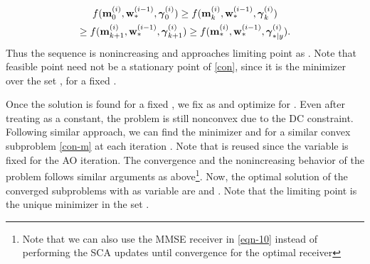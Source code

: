 \begin{multline} \label{con-convergence}
f(\iter{\mx}{0}{i},\iter{\my}{\ast}{i-1},\iter{\mz}{0}{i}) \geq f(\iter{\mx}{k}{i},\iter{\my}{\ast}{i-1},\iter{\mz}{k}{i}) \\ \geq f(\iter{\mx}{k+1}{i},\iter{\my}{\ast}{i-1},\iter{\mz}{k+1}{i}) \geq f(\iter{\mx}{\ast}{i},\iter{\my}{\ast}{i-1},\iter{\mz}{\ast|y}{i}). 
\end{multline}
Thus the sequence  is nonincreasing and approaches limiting point as . Note that feasible point  need not be a stationary point of \eqref{con}, since it is the minimizer over the set , for a fixed \me{\my}.

Once the solution is found for a fixed \me{\my}, we fix \me{\mx} as  and optimize for \me{\my}. Even after treating \me{\mx} as a constant, the problem is still nonconvex due to the \ac{DC} constraint. Following similar approach, we can find the minimizer  and  for a similar convex subproblem \eqref{con-m} at each iteration . Note that  is reused since the variable \me{\mx} is fixed for the  \ac{AO} iteration. The convergence and the nonincreasing behavior of the problem follows similar arguments as above\footnote{Note that we can also use the \ac{MMSE} receiver in \eqref{eqn-10} instead of performing the \ac{SCA} updates until convergence for the optimal receiver}. Now, the optimal solution of the converged subproblems with \me{\my} as variable are  and . Note that the limiting point  is the unique minimizer in the set .

